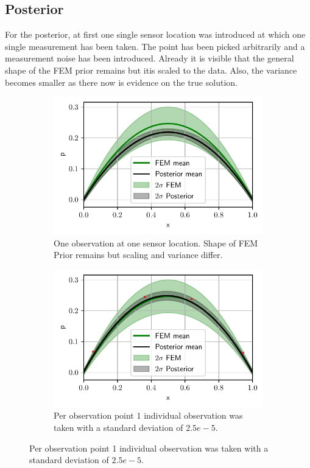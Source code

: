 \documentclass[%
  a4paper,oneside,%
  11pt,%
  smallchapters,
  style=printdev,
  extramargin,
  green,%
  rgb, <cmyk>
  ]{tubsbook}
\begin{document}
\subsection{Posterior}
For the posterior, at first one single sensor location was introduced at which one single measurement has been taken. The point has been picked arbitrarily and a measurement noise has been introduced. Already it is visible that the general shape of the FEM prior remains but itis scaled to the data. Also, the variance becomes smaller as there now is evidence on the true solution.
%
\begin{figure}[!ht]

\centering

	\begin{subfigure}[t]{.5\textwidth}
	\centering
	\includegraphics[width=1\linewidth]{../../Python/Results/1D/Model_Error/1o_1s/Result.pdf}
	\caption{One observation at one sensor location. Shape of FEM Prior remains but scaling and variance differ.}	
	\label{fig:OneSensor}
	\end{subfigure}%
	\begin{subfigure}[t]{.5\textwidth}
	\centering
	\includegraphics[width=1\linewidth]{../../Python/Results/1D/Model_Error/1o_4s/Result.pdf}
	\caption{Per observation point 1 individual observation was taken with a standard deviation of $2.5e-5$. }	
	\label{fig:4p10}
	\end{subfigure}
	

\end{figure}
\end{document}
